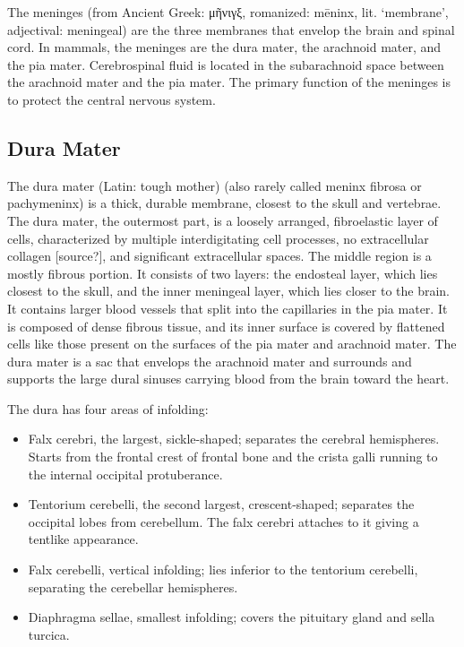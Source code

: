 The meninges (from Ancient Greek: μῆνιγξ, romanized: mēninx, lit. `membrane', adjectival: meningeal) are the three membranes that envelop the brain and spinal cord. In mammals, the meninges are the dura mater, the arachnoid mater, and the pia mater. Cerebrospinal fluid is located in the subarachnoid space between the arachnoid mater and the pia mater. The primary function of the meninges is to protect the central nervous system.

\hypertarget{dura-mater}{%
\subsection{Dura Mater}\label{dura-mater}}

The dura mater (Latin: tough mother) (also rarely called meninx fibrosa or pachymeninx) is a thick, durable membrane, closest to the skull and vertebrae. The dura mater, the outermost part, is a loosely arranged, fibroelastic layer of cells, characterized by multiple interdigitating cell processes, no extracellular collagen {[}source?{]}, and significant extracellular spaces. The middle region is a mostly fibrous portion. It consists of two layers: the endosteal layer, which lies closest to the skull, and the inner meningeal layer, which lies closer to the brain. It contains larger blood vessels that split into the capillaries in the pia mater. It is composed of dense fibrous tissue, and its inner surface is covered by flattened cells like those present on the surfaces of the pia mater and arachnoid mater. The dura mater is a sac that envelops the arachnoid mater and surrounds and supports the large dural sinuses carrying blood from the brain toward the heart.

The dura has four areas of infolding:

\begin{itemize}
\tightlist
\item
  Falx cerebri, the largest, sickle-shaped; separates the cerebral hemispheres. Starts from the frontal crest of frontal bone and the crista galli running to the internal occipital protuberance.
\item
  Tentorium cerebelli, the second largest, crescent-shaped; separates the occipital lobes from cerebellum. The falx cerebri attaches to it giving a tentlike appearance.
\item
  Falx cerebelli, vertical infolding; lies inferior to the tentorium cerebelli, separating the cerebellar hemispheres.
\item
  Diaphragma sellae, smallest infolding; covers the pituitary gland and sella turcica.
\end{itemize}

